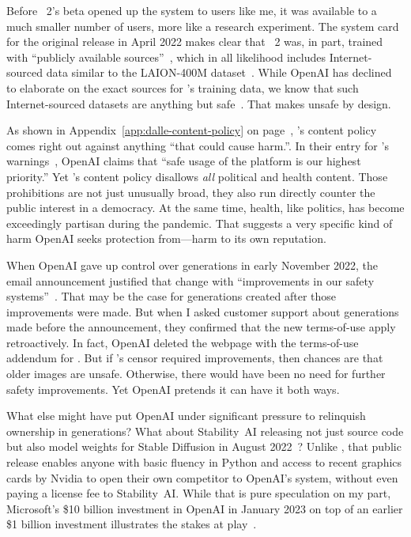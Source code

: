 Before \DALLE~2's beta opened up the system to users like me, it was available
to a much smaller number of users, more like a research experiment. The system
card~\cite{GreenProcopeea2022,ProcopeCheemaea2022} for the original release in
April 2022 makes clear that \DALLE~2 was, in part, trained with ``publicly
available sources''~\cite{MishkinAhmad2022}, which in all likelihood includes
Internet-sourced data similar to the LAION-400M
dataset~\cite{SchuhmannVencuea2021}. While OpenAI has declined to elaborate on
the exact sources for \DALLE's training data, we know that such Internet-sourced
datasets are anything but safe~\cite{BirhanePrabhuea2021}. That makes \DALLE{}
unsafe by design.

As shown in Appendix~\ref{app:dalle-content-policy} on
page~\pageref{app:dalle-content-policy}, \DALLE's content policy comes right out
against anything ``that could cause harm.''. In their  entry for \DALLE's
warnings~\cite{Natalie2022}, OpenAI claims that ``safe usage of the platform is
our highest priority.'' Yet \DALLE's content policy disallows \emph{all}
political and health content. Those prohibitions are not just unusually broad,
they also run directly counter the public interest in a democracy. At the same
time, health, like politics, has become exceedingly partisan during the
pandemic. That suggests a very specific kind of harm OpenAI seeks protection
from---harm to its own reputation.

When OpenAI gave up control over generations in early November 2022, the email
announcement justified that change with ``improvements in our safety
systems''~\cite{OpenAI2022g}. That may be the case for generations created after
those improvements were made. But when I asked customer support about
generations made before the announcement, they confirmed that the new
terms-of-use apply retroactively. In fact, OpenAI deleted the webpage with the
terms-of-use addendum for \DALLE. But if \DALLE's censor required improvements,
then chances are that older images are unsafe. Otherwise, there would have been
no need for further safety improvements. Yet OpenAI pretends it can have it both
ways.

What else might have put OpenAI under significant pressure to relinquish
ownership in generations? What about Stability~AI releasing not just source code
but also model weights for Stable Diffusion in August
2022~\cite{StabilityAI2022}? Unlike \DALLE, that public release enables anyone
with basic fluency in Python and access to recent graphics cards by Nvidia to
open their own competitor to OpenAI's system, without even paying a license fee
to Stability~AI. While that is pure speculation on my part, Microsoft's \$10
billion investment in OpenAI in January 2023 on top of an earlier \$1 billion
investment illustrates the stakes at play~\cite{Bass2023}.

